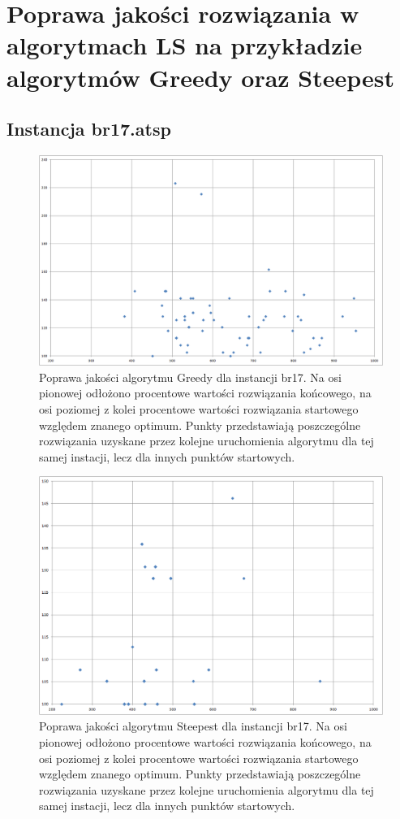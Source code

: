 \section{Poprawa jakości rozwiązania w algorytmach LS na przykładzie algorytmów Greedy oraz Steepest}
\subsection{Instancja br17.atsp}
\begin{figure}[!h]
\centering\includegraphics[width=12cm]{img/br17_b2e_g.png}
\caption{Poprawa jakości algorytmu Greedy dla instancji br17. Na osi pionowej odłożono procentowe wartości rozwiązania końcowego, na osi poziomej z kolei procentowe wartości rozwiązania startowego względem znanego optimum. Punkty przedstawiają poszczególne rozwiązania uzyskane przez kolejne uruchomienia algorytmu dla tej samej instacji, lecz dla innych punktów startowych.}\label{rys:br17g}
\end{figure}
\begin{figure}[!h]
\centering\includegraphics[width=12cm]{img/br17_b2e_s.png}
\caption{Poprawa jakości algorytmu Steepest dla instancji br17. Na osi pionowej odłożono procentowe wartości rozwiązania końcowego, na osi poziomej z kolei procentowe wartości rozwiązania startowego względem znanego optimum. Punkty przedstawiają poszczególne rozwiązania uzyskane przez kolejne uruchomienia algorytmu dla tej samej instacji, lecz dla innych punktów startowych.}\label{rys:br17s}
\end{figure}

